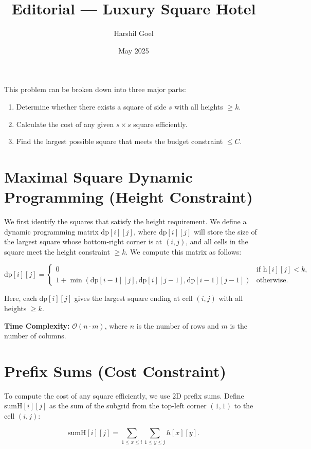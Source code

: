 \documentclass{article}
\title{\textbf{Editorial — Luxury Square Hotel}}
\author{Harshil Goel}
\date{May 2025}
\begin{document}
\maketitle

This problem can be broken down into three major parts:

\begin{enumerate}
  \item Determine whether there exists a square of side $s$ with all heights $\geq k$.
  \item Calculate the cost of any given $s \times s$ square efficiently.
  \item Find the largest possible square that meets the budget constraint $\leq C$.
\end{enumerate}

\section{Maximal Square Dynamic Programming (Height Constraint)}

We first identify the squares that satisfy the height requirement. We define a dynamic programming matrix $\text{dp}[i][j]$, where $\text{dp}[i][j]$ will store the size of the largest square whose bottom-right corner is at $(i, j)$, and all cells in the square meet the height constraint $\geq k$. We compute this matrix as follows:

\[
\text{dp}[i][j] = \begin{cases}
  0 & \text{if } \text{h}[i][j]< k, \\
  1 + \min(\text{dp}[i-1][j], \text{dp}[i][j-1], \text{dp}[i-1][j-1]) & \text{otherwise.}
\end{cases}
\]

Here, each $\text{dp}[i][j]$ gives the largest square ending at cell $(i, j)$ with all heights $\geq k$.

\textbf{Time Complexity:} $\mathcal{O}(n \cdot m)$, where $n$ is the number of rows and $m$ is the number of columns.

\section{Prefix Sums (Cost Constraint)}

To compute the cost of any square efficiently, we use 2D prefix sums. Define $\text{sumH}[i][j]$ as the sum of the subgrid from the top-left corner $(1,1)$ to the cell $(i,j)$:

\[
\text{sumH}[i][j] = \sum_{1 \leq x \leq i} \sum_{1 \leq y \leq j} h[x][y].
\]
\end{document}
